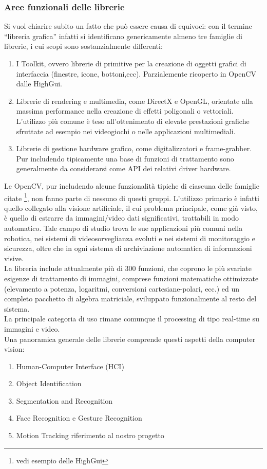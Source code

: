 \subsubsection{Aree funzionali delle librerie}\label{AreeFunz}
Si vuol chiarire subito un fatto che può essere causa di equivoci: con il termine ``libreria grafica'' infatti si identificano genericamente almeno tre famiglie di librerie, i cui scopi sono sostanzialmente differenti:
\begin{enumerate}
 \item  I Toolkit, ovvero librerie di primitive per la creazione di oggetti grafici di interfaccia (finestre, icone, bottoni,ecc). Parzialemente ricoperto in OpenCV dalle HighGui.
\item Librerie di rendering e multimedia, come DirectX e OpenGL, orientate alla massima performance nella creazione di effetti poligonali o vettoriali. L’utilizzo più comune è teso all’ottenimento di elevate prestazioni    grafiche sfruttate ad esempio nei videogiochi o nelle applicazioni multimediali.
\item  Librerie di gestione hardware grafico, come digitalizzatori e frame-grabber. Pur includendo tipicamente una base di funzioni di trattamento sono generalmente da considerarsi come API dei relativi driver hardware.
\end{enumerate}

Le OpenCV, pur includendo alcune funzionalità tipiche di ciascuna delle famiglie citate \footnote{vedi esempio delle HighGui}, non fanno parte di nessuno di questi gruppi. L’utilizzo primario è infatti quello collegato alla visione artificiale, il cui problema principale, come già visto, è quello di estrarre da immagini/video dati significativi, trattabili in modo automatico. Tale campo di studio trova le sue applicazioni più comuni nella robotica, nei sistemi di  videosorveglianza evoluti e nei sistemi di monitoraggio e sicurezza, oltre che in ogni sistema di archiviazione automatica di informazioni visive.\\

La libreria include attualmente più di 300 funzioni, che coprono le più svariate esigenze di trattamento di immagini, comprese funzioni matematiche ottimizzate (elevamento a potenza, logaritmi, conversioni cartesiane-polari, ecc.) ed  un completo pacchetto di algebra matriciale, sviluppato funzionalmente al resto del sistema.\\

La principale categoria di uso rimane comunque il processing di tipo real-time su immagini e video. \\
Una panoramica generale delle librerie comprende questi aspetti della computer vision:
\begin{enumerate}
\item Human-Computer Interface (HCI)
\item Object Identification
\item Segmentation and Recognition
\item Face Recognition e Gesture Recognition
\item Motion Tracking  riferimento al nostro progetto
\end{enumerate}

